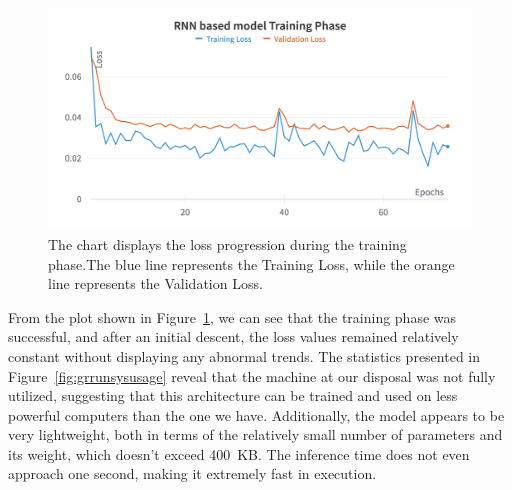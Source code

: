 \begin{figure}[H]
	\centering
	\includegraphics[width=.8\linewidth]{chapters/3_models/imgs/grrun/grruntraining.png}
	\caption{The chart displays the loss progression during the training phase.The blue line represents the Training Loss, while the orange line represents the Validation Loss.}
	\label{fig:grruntraining}
\end{figure}

From the plot shown in Figure~\ref{fig:grruntraining},
we can see that the training phase was successful,
and after an initial descent, the loss values remained relatively
constant without displaying any abnormal trends.
The statistics presented in Figure~\ref{fig:grrunsysusage} reveal
that the machine at our disposal was not fully utilized,
suggesting that this architecture can be trained and used on
less powerful computers than the one we have.
Additionally, the model appears to be very lightweight, both in terms
of the relatively small number of parameters and its weight,
which doesn't exceed 400~KB. The inference time does not even
approach one second, making it extremely fast in execution.

